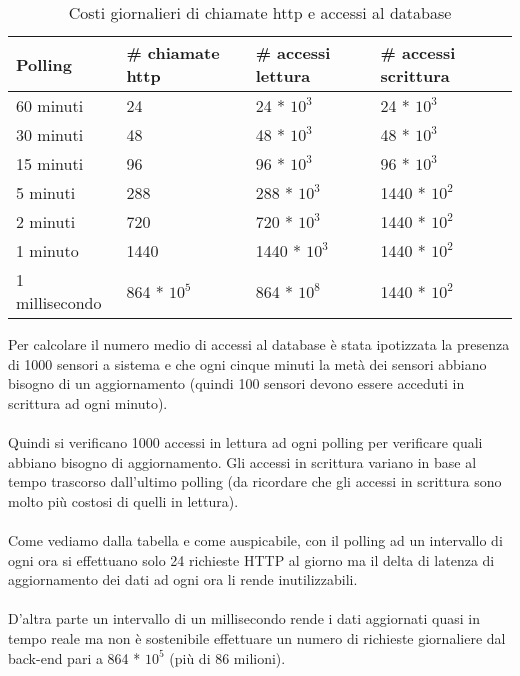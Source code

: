 \renewcommand{\arraystretch}{1.5}
\begin{table}[H]
    \begin{tabular}{|p{2.85cm}|p{3.05cm}|p{3.05cm}|p{3.35cm}|} 
    \hline
    \textbf{Polling} & \textbf{\# chiamate http}  & \textbf{\# accessi lettura} & \textbf{\# accessi scrittura} \\ 
    \hline
    60 minuti & 24 & 24 * $10^3$ & 24 * $10^3$ \\
    \hline
    30 minuti & 48 & 48 * $10^3$ & 48 * $10^3$ \\
    \hline
    15 minuti & 96 & 96 * $10^3$ & 96 * $10^3$ \\
    \hline
    5 minuti & 288 & 288 * $10^3$ & 1440 * $10^2$ \\
    \hline
    2 minuti & 720 & 720 * $10^3$ & 1440 * $10^2$ \\
    \hline
    1 minuto & 1440 & 1440 * $10^3$ & 1440 * $10^2$ \\
    \hline
    1 millisecondo & 864 * $10^5$ & 864 * $10^8$ & 1440 * $10^2$ \\
    \hline
    \end{tabular}
    \caption{Costi giornalieri di chiamate http e accessi al database}
\end{table}
\leavevmode\newline
Per calcolare il numero medio di accessi al database è stata ipotizzata la presenza di 1000 sensori a sistema e che 
ogni cinque minuti la metà dei sensori abbiano bisogno di un aggiornamento (quindi 100 sensori devono essere 
acceduti in scrittura ad ogni minuto). 
\\\\
Quindi si verificano 1000 accessi in lettura ad ogni polling per verificare quali abbiano bisogno di aggiornamento.
Gli accessi in scrittura variano in base al tempo trascorso dall'ultimo polling (da ricordare che gli accessi in scrittura sono molto
più costosi di quelli in lettura).
\\\\
Come vediamo dalla tabella e come auspicabile, con il polling ad un intervallo di ogni ora si effettuano solo
24 richieste \gls{HTTP} al giorno ma il delta di latenza di aggiornamento dei dati ad ogni ora li rende inutilizzabili.
\\\\
D'altra parte un intervallo di un millisecondo rende i dati aggiornati quasi in tempo reale ma 
non è sostenibile effettuare un numero di richieste giornaliere dal \gls{back-end} pari a 864 * $10^5$ (più di 86 milioni).
